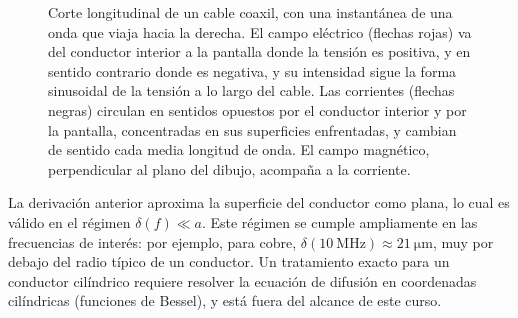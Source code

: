 \begin{figure}
\begin{center}
    \end{center}
    \caption{Corte longitudinal de un cable coaxil, con una instantánea de una onda que viaja hacia la derecha. El campo eléctrico (flechas rojas) va del conductor interior a la pantalla donde la tensión es positiva, y en sentido contrario donde es negativa, y su intensidad sigue la forma sinusoidal de la tensión a lo largo del cable. Las corrientes (flechas negras) circulan en sentidos opuestos por el conductor interior y por la pantalla, concentradas en sus superficies enfrentadas, y cambian de sentido cada media longitud de onda. El campo magnético, perpendicular al plano del dibujo, acompaña a la corriente.}\label{fig:coaxil longitudinal}
\end{figure}

\begin{remark}
La derivación anterior aproxima la superficie del conductor como plana, lo cual es válido en el régimen $\delta(f)\ll a$. Este régimen se cumple ampliamente en las frecuencias de interés: por ejemplo, para cobre, $\delta(10\ \unit{\mega\hertz})\approx 21\ \unit{\micro\meter}$, muy por debajo del radio típico de un conductor. Un tratamiento exacto para un conductor cilíndrico requiere resolver la ecuación de difusión en coordenadas cilíndricas (funciones de Bessel), y está fuera del alcance de este curso.
\end{remark}

